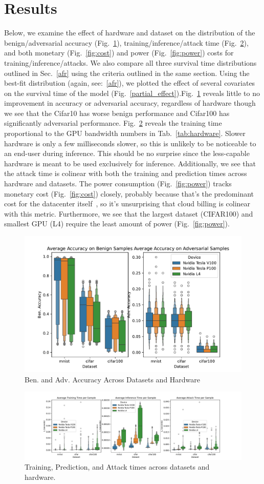 \documentclass[conference]{IEEEtran}
\begin{document}
\section{Results}
Below, we examine the effect of hardware and dataset on the distribution of the benign/adversarial accuracy (Fig.~\ref{fig:acc}), training/inference/attack time (Fig.~\ref{fig:time}), and both monetary (Fig.~\ref{fig:cost}) and power (Fig.~\ref{fig:power}) costs for training/inference/attacks. We also compare all three survival time distributions outlined in Sec.~\ref{afr} using the criteria outlined in the same section. Using the best-fit distribution (again, see:~\ref{afr}), we plotted the effect of several covariates on the survival time of the model (Fig.~\ref{partial_effect}).Fig.~\ref{fig:acc} reveals little to no improvement in accuracy or adversarial accuracy, regardless of hardware though we see that the Cifar10 has worse benign performance and Cifar100 has significantly adversarial performance. Fig.~\ref{fig:time} reveals the training time proportional to the GPU bandwidth numbers in Tab.~\ref{tab:hardware}. Slower hardware is only a few milliseconds slower, so this is unlikely to be noticeable to an end-user during inference. This should be no surprise since the less-capable hardware is meant to be used exclusively for inference. Additionally, we see that the attack time is colinear with both the training and prediction times across hardware and datasets.
The power consumption (Fig.~\ref{fig:power})  tracks monetary cost  (Fig.~\ref{fig:cost}) closely, probably because that's the predominant cost for the datacenter itself~\cite{dayarathna2015data}, so it's unsurprising that cloud billing is colinear with this metric. Furthermore, we see that the largest dataset (CIFAR100) and smallest GPU (L4) require the least amount of power (Fig.~\ref{fig:power}). 

\begin{figure}
    \centering
    \includegraphics[width=.5\textwidth]{plots/combined/acc.pdf}
    \caption{Ben. and Adv. Accuracy Across Datasets and Hardware}
    \label{fig:acc}
\end{figure}
\begin{figure}
    \centering
    \includegraphics[width=\textwidth]{plots/combined/time.pdf}
    \caption{Training, Prediction, and Attack times across datasets and hardware.}
    \label{fig:time}
\end{figure}
\end{document}
